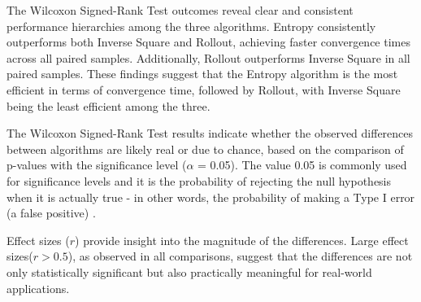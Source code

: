 \documentclass[../report.tex]{subfiles}
\begin{document}
    The Wilcoxon Signed-Rank Test outcomes reveal clear and consistent performance hierarchies among the three algorithms. Entropy consistently outperforms both Inverse Square and Rollout, 
    achieving faster convergence times across all paired samples. Additionally, Rollout outperforms Inverse Square in all paired samples. These findings suggest that the Entropy algorithm is the 
    most efficient in terms of convergence time, followed by Rollout, with Inverse Square being the least efficient among the three.

    The Wilcoxon Signed-Rank Test results indicate whether the observed differences between algorithms are likely real or due to chance, based on the comparison of p-values with the significance 
    level ($\alpha$ = 0.05). The value 0.05 is commonly used for significance levels and it is the probability of rejecting the null hypothesis when it is actually true - in other words, the probability of making a Type I error (a false positive) \cite{loftus2021basic}. 

    Effect sizes ($r$) provide insight into the magnitude of the differences. Large effect sizes($r > 0.5$), as observed in all comparisons, suggest that the differences are not only statistically significant 
    but also practically meaningful for real-world applications.
\end{document}
